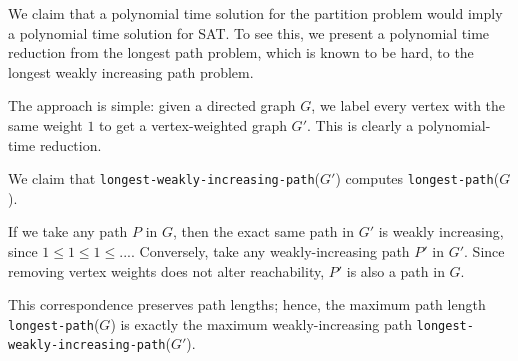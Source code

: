 \documentclass{article}
\begin{document}
\begin{solution}
We claim that a polynomial time solution for the partition problem would imply a polynomial time solution for SAT. To see this, we present a polynomial time reduction from the longest path problem, which is known to be hard, to the longest weakly increasing path problem.

The approach is simple: given a directed graph \( G \), we label every vertex with the same weight \( 1 \) to get a vertex-weighted graph \( G' \). This is clearly a polynomial-time reduction.

\begin{subproof} [Correctness]
We claim that \texttt{longest-weakly-increasing-path}(\( G' \)) computes \texttt{longest-path}(\( G \)).

If we take any path \( P \) in \( G \), then the exact same path in \( G' \) is weakly increasing, since \( 1 \leq 1 \leq 1 \leq ... \). Conversely, take any weakly-increasing path \( P' \) in \( G' \). Since removing vertex weights does not alter reachability, \( P' \) is also a path in \( G \).

This correspondence preserves path lengths; hence, the maximum path length \texttt{longest-path}(\( G \)) is exactly the maximum weakly-increasing path \texttt{longest-weakly-increasing-path}(\( G' \)).
\end{subproof}
\end{solution}
\pagebreak
\end{document}
